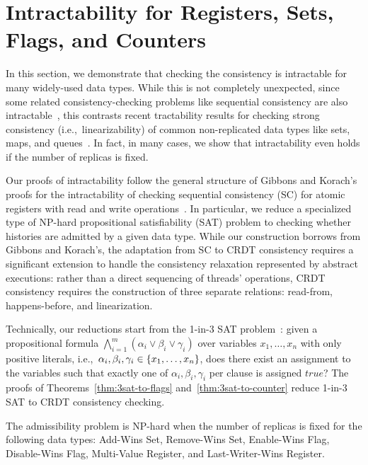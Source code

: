 
\section{Intractability for Registers, Sets, Flags, and Counters}
\label{sec:intractability}

In this section, we demonstrate that checking the consistency is intractable for many widely-used data types. While this is not completely unexpected, since some related consistency-checking problems like sequential consistency are also intractable~\cite{DBLP:journals/siamcomp/GibbonsK97}, this contrasts recent tractability results for checking strong consistency (i.e.,~linearizability) of common non-replicated data types like sets, maps, and queues~\cite{DBLP:journals/pacmpl/EmmiE19}. In fact, in many cases, we show that intractability even holds if the number of replicas is fixed.

Our proofs of intractability follow the general structure of Gibbons and Korach’s proofs for the intractability of checking sequential consistency (SC) for atomic registers with read and write operations~\cite{DBLP:journals/siamcomp/GibbonsK97}. In particular, we reduce a specialized type of NP-hard propositional satisfiability (SAT) problem to checking whether histories are admitted by a given data type. While our construction borrows from Gibbons and Korach’s, the adaptation from SC to CRDT consistency requires a significant extension to handle the consistency relaxation represented by abstract executions: rather than a direct sequencing of threads’ operations, CRDT consistency requires the construction of three separate relations: read-from, happens-before, and linearization.

Technically, our reductions start from the 1-in-3 SAT problem~\cite{DBLP:books/fm/GareyJ79}: given a propositional formula $\bigwedge_{i=1}^{m} (\alpha_i \lor \beta_i \lor \gamma_i)$ over variables $x_1, \ldots, x_n$ with only positive literals, i.e.,~$\alpha_i, \beta_i, \gamma_i \in {\{{ x_1, \ldots, x_n }\}}$, does there exist an assignment to the variables such that exactly one of $\alpha_i, \beta_i, \gamma_i$ per clause is assigned $\mathit{true}$? The proofs of Theorems~\ref{thm:3sat-to-flags} and~\ref{thm:3sat-to-counter} reduce 1-in-3 SAT to CRDT consistency checking.

\vspace{-1mm}
\begin{theorem}
  \label{thm:3sat-to-flags}

  The admissibility problem is NP-hard when the number of replicas is fixed for the following data types: Add-Wins Set, Remove-Wins Set, Enable-Wins Flag, Disable-Wins Flag, Multi-Value Register, and Last-Writer-Wins Register.
\vspace{-1mm}
\end{theorem}

